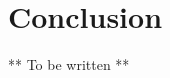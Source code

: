 \documentclass[letter,12pt]{article}
\begin{document}




\section{Conclusion}

** To be written **
\end{document}
